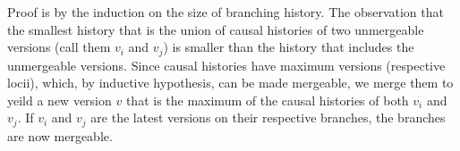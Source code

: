 Proof is by the induction on the size of branching history. The
observation that the smallest history that is the union of causal
histories of two unmergeable versions (call them $v_i$ and $v_j$) is
smaller than the history that includes the unmergeable versions. Since
causal histories have maximum versions (respective locii), which, by
inductive hypothesis, can be made mergeable, we merge them to yeild a
new version $v$ that is the maximum of the causal histories of both
$v_i$ and $v_j$. If $v_i$ and $v_j$ are the latest versions on their
respective branches, the branches are now mergeable.  


